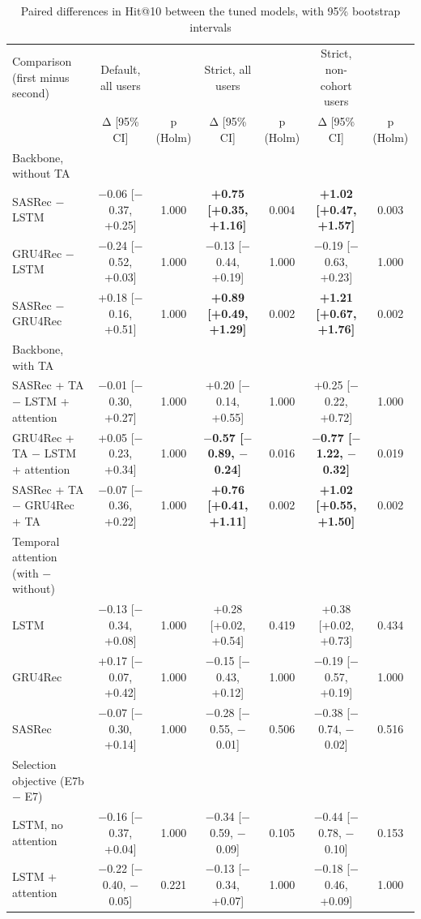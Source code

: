 \begin{table}[t]\centering\footnotesize
\caption{Paired differences in Hit@10 between the tuned models, with 95\% bootstrap intervals}
\begin{tabular}{lcccccc}\toprule
Comparison (first minus second) & Default, all users &  & Strict, all users &  & Strict, non-cohort users &  \\
 & Δ [95\% CI] & p (Holm) & Δ [95\% CI] & p (Holm) & Δ [95\% CI] & p (Holm) \\
\midrule
Backbone, without TA &  &  &  &  &  &  \\
SASRec $-$ LSTM & $-$0.06 [$-$0.37, +0.25] & 1.000 & \textbf{+0.75 [+0.35, +1.16]} & 0.004 & \textbf{+1.02 [+0.47, +1.57]} & 0.003 \\
GRU4Rec $-$ LSTM & $-$0.24 [$-$0.52, +0.03] & 1.000 & $-$0.13 [$-$0.44, +0.19] & 1.000 & $-$0.19 [$-$0.63, +0.23] & 1.000 \\
SASRec $-$ GRU4Rec & +0.18 [$-$0.16, +0.51] & 1.000 & \textbf{+0.89 [+0.49, +1.29]} & 0.002 & \textbf{+1.21 [+0.67, +1.76]} & 0.002 \\
Backbone, with TA &  &  &  &  &  &  \\
SASRec + TA $-$ LSTM + attention & $-$0.01 [$-$0.30, +0.27] & 1.000 & +0.20 [$-$0.14, +0.55] & 1.000 & +0.25 [$-$0.22, +0.72] & 1.000 \\
GRU4Rec + TA $-$ LSTM + attention & +0.05 [$-$0.23, +0.34] & 1.000 & \textbf{$-$0.57 [$-$0.89, $-$0.24]} & 0.016 & \textbf{$-$0.77 [$-$1.22, $-$0.32]} & 0.019 \\
SASRec + TA $-$ GRU4Rec + TA & $-$0.07 [$-$0.36, +0.22] & 1.000 & \textbf{+0.76 [+0.41, +1.11]} & 0.002 & \textbf{+1.02 [+0.55, +1.50]} & 0.002 \\
Temporal attention (with $-$ without) &  &  &  &  &  &  \\
LSTM & $-$0.13 [$-$0.34, +0.08] & 1.000 & +0.28 [+0.02, +0.54] & 0.419 & +0.38 [+0.02, +0.73] & 0.434 \\
GRU4Rec & +0.17 [$-$0.07, +0.42] & 1.000 & $-$0.15 [$-$0.43, +0.12] & 1.000 & $-$0.19 [$-$0.57, +0.19] & 1.000 \\
SASRec & $-$0.07 [$-$0.30, +0.14] & 1.000 & $-$0.28 [$-$0.55, $-$0.01] & 0.506 & $-$0.38 [$-$0.74, $-$0.02] & 0.516 \\
Selection objective (E7b $-$ E7) &  &  &  &  &  &  \\
LSTM, no attention & $-$0.16 [$-$0.37, +0.04] & 1.000 & $-$0.34 [$-$0.59, $-$0.09] & 0.105 & $-$0.44 [$-$0.78, $-$0.10] & 0.153 \\
LSTM + attention & $-$0.22 [$-$0.40, $-$0.05] & 0.221 & $-$0.13 [$-$0.34, +0.07] & 1.000 & $-$0.18 [$-$0.46, +0.09] & 1.000 \\

\end{tabular}
\end{table}
